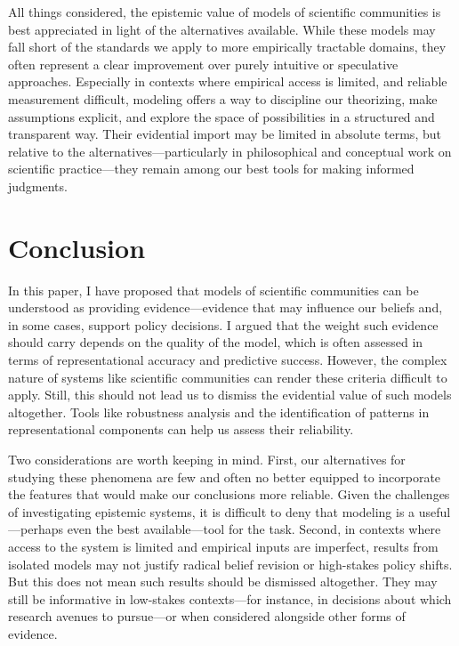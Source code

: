 \documentclass{article}
\begin{document}
All things considered, the epistemic value of models of scientific communities is best appreciated in light of the alternatives available. While these models may fall short of the standards we apply to more empirically tractable domains, they often represent a clear improvement over purely intuitive or speculative approaches. Especially in contexts where empirical access is limited, and reliable measurement difficult, modeling offers a way to discipline our theorizing, make assumptions explicit, and explore the space of possibilities in a structured and transparent way. Their evidential import may be limited in absolute terms, but relative to the alternatives—particularly in philosophical and conceptual work on scientific practice—they remain among our best tools for making informed judgments.

\section{Conclusion}

In this paper, I have proposed that models of scientific communities can be understood as providing evidence—evidence that may influence our beliefs and, in some cases, support policy decisions. I argued that the weight such evidence should carry depends on the quality of the model, which is often assessed in terms of representational accuracy and predictive success. However, the complex nature of systems like scientific communities can render these criteria difficult to apply. Still, this should not lead us to dismiss the evidential value of such models altogether. Tools like robustness analysis and the identification of patterns in representational components can help us assess their reliability.

Two considerations are worth keeping in mind. First, our alternatives for studying these phenomena are few and often no better equipped to incorporate the features that would make our conclusions more reliable. Given the challenges of investigating epistemic systems, it is difficult to deny that modeling is a useful—perhaps even the best available—tool for the task. Second, in contexts where access to the system is limited and empirical inputs are imperfect, results from isolated models may not justify radical belief revision or high-stakes policy shifts. But this does not mean such results should be dismissed altogether. They may still be informative in low-stakes contexts—for instance, in decisions about which research avenues to pursue—or when considered alongside other forms of evidence.
\end{document}
